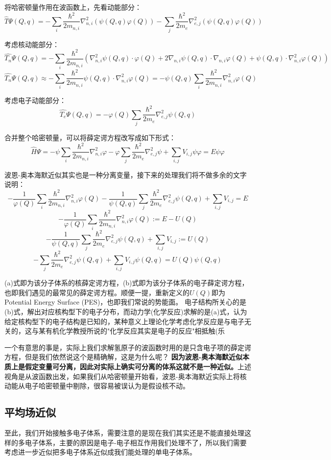 将哈密顿量作用在波函数上，先看动能部分：
\[\hat{T}\varPsi(Q,q)=-\sum_i\frac{\hbar^2}{2m_{n,i}}\nabla^2_{n,i}(\psi(Q,q)\varphi(Q))-\sum_j\frac{\hbar^2}{2m_e}\nabla^2_{e,j}(\psi(Q,q)\varphi(Q))\]

考虑核动能部分：
\[\hat{T_n}\varPsi(Q,q)=-\sum_i\frac{\hbar^2}{2m_{n,i}}\left (\nabla^2_{n,i}\psi(Q,q) \cdot \varphi(Q)+2\nabla_{n,i}\psi(Q,q) \cdot \nabla_{n,i}\varphi(Q)+ \psi(Q,q) \cdot \nabla^2_{n,i}\varphi(Q)  \right )\]
\[\hat{T_n}\varPsi(Q,q) \approx -\sum_i\frac{\hbar^2}{2m_{n,i}}\psi(Q,q) \cdot \nabla^2_{n,i}\varphi(Q)=-\psi(Q,q)\sum_i\frac{\hbar^2}{2m_{n,i}}\nabla^2_{n,i}\varphi(Q)\]

考虑电子动能部分：
\[\hat{T_e}\varPsi(Q,q)=-\varphi(Q)\sum_j\frac{\hbar^2}{2m_e}\nabla^2_{e,j}\psi(Q,q)\]

合并整个哈密顿量，可以将薛定谔方程改写成如下形式：
\[\hat{H}\varPsi=-\psi\sum_i\frac{\hbar^2}{2m_{n,i}}\nabla^2_{n,i}\varphi-\varphi\sum_j\frac{\hbar^2}{2m_e}\nabla^2_{e,j}\psi+\sum_{i,j}V_{i,j}\psi\varphi=E\psi\varphi\]

波恩-奥本海默近似其实也是一种分离变量，接下来的处理我们将不做多余的文字说明：
\[-\frac{1}{\varphi(Q)}\sum_i\frac{\hbar^2}{2m_{n,i}}\nabla^2_{n,i}\varphi(Q)-\frac{1}{\psi(Q,q)}\sum_j\frac{\hbar^2}{2m_e}\nabla^2_{e,j}\psi(Q,q)+\sum_{i,j}V_{i,j}=E\]
\[-\frac{1}{\varphi(Q)}\sum_i\frac{\hbar^2}{2m_{n,i}}\nabla^2_{n,i}\varphi(Q):=E-U(Q) \tag{a}\]
\[-\frac{1}{\psi(Q,q)}\sum_j\frac{\hbar^2}{2m_e}\nabla^2_{e,j}\psi(Q,q)+\sum_{i,j}V_{i,j}:=U(Q)\]
\[-\sum_j\frac{\hbar^2}{2m_e}\nabla^2_{e,j}\psi(Q,q)+\sum_{i,j}V_{i,j}\psi(Q,q)=U(Q)\psi(Q,q) \tag{b}\]

(a)式即为该分子体系的核薛定谔方程，(b)式即为该分子体系的电子薛定谔方程，也即我们遇见的最常见的薛定谔方程。顺便一提，重新定义的$U(Q)$即为Potential Energy Surface (PES)，也即我们常说的势能面。
电子结构所关心的是(b)式，解出对应核构型下的电子分布，而动力学(化学反应)求解的是(a)式，认为给定核构型下的电子结构是已知的，某种意义上理论化学考虑化学反应是与电子无关的，这与某有机化学教授所说的"化学反应其实是电子的反应"相抵触(乐

一个有意思的事是，实际上我们求解氢原子的波函数时用的是只含电子项的薛定谔方程，但是我们依然说这个是精确解，这是为什么呢？
\textbf{因为波恩-奥本海默近似本质上是假定变量可分离，因此对实际上确实可分离的体系这就不是一种近似。}上述视角是从波函数出发，如果我们从哈密顿量开始看，波恩-奥本海默近实际上将核动能从电子哈密顿量中剔除，很容易被误认为是假设核不动。

\subsection{平均场近似}
至此，我们开始接触多电子体系，需要注意的是现在我们其实还是不能直接处理这样的多电子体系，主要的原因是电子-电子相互作用我们处理不了，所以我们需要考虑进一步近似把多电子体系近似成我们能处理的单电子体系。

